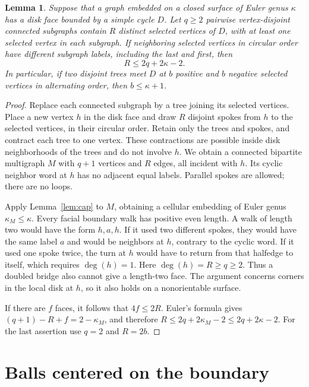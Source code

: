 \documentclass[11pt]{article}
\newtheorem{lemma}[theorem]{Lemma}
\theoremstyle{remark}
\begin{document}
\begin{lemma}\label{lem:hub}
Suppose that a graph embedded on a closed surface of Euler genus $\kappa$
has a disk face bounded by a simple cycle $D$. Let $q\ge2$ pairwise
vertex-disjoint connected subgraphs contain $R$ distinct selected vertices
of $D$, with at least one selected vertex in each subgraph.
If neighboring selected vertices in circular order have different
subgraph labels, including the last and first, then
\begin{equation}\label{eq:hub}
R\le2q+2\kappa-2.
\end{equation}
In particular, if two disjoint trees meet $D$ at $b$ positive and $b$
negative selected vertices in alternating order, then $b\le\kappa+1$.
\end{lemma}
\begin{proof}
Replace each connected subgraph by a tree joining its selected vertices.
Place a new vertex $h$ in the disk face and draw $R$ disjoint spokes from
$h$ to the selected vertices, in their circular order. Retain only the
trees and spokes, and contract each tree to one vertex. These contractions
are possible inside disk neighborhoods of the trees and do not involve
$h$. We obtain a connected bipartite multigraph $M$ with $q+1$ vertices
and $R$ edges, all incident with $h$. Its cyclic neighbor word at $h$ has
no adjacent equal labels. Parallel spokes are allowed; there are no loops.

Apply Lemma~\ref{lem:cap} to $M$, obtaining a cellular embedding of Euler
genus $\kappa_M\le\kappa$. Every facial boundary walk has positive even
length. A walk of length two would have the form $h,a,h$. If it used two
different spokes, they would have the same label $a$ and would be neighbors
at $h$, contrary to the cyclic word. If it used one spoke twice, the turn
at $h$ would have to return from that halfedge to itself, which requires
$\deg(h)=1$. Here $\deg(h)=R\ge q\ge2$. Thus a doubled bridge also cannot
give a length-two face. The argument concerns corners in the local disk
at $h$, so it also holds on a nonorientable surface.

If there are $f$ faces, it follows that $4f\le2R$. Euler's formula gives
$(q+1)-R+f=2-\kappa_M$, and therefore
$R\le2q+2\kappa_M-2\le2q+2\kappa-2$.
For the last assertion use $q=2$ and $R=2b$.
\end{proof}

\section{Balls centered on the boundary}\label{sec:balls}
\end{document}
